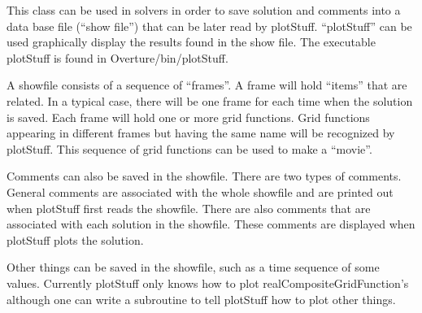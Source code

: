 \documentclass{article}
\begin{document}
This class can be used in solvers in order to save solution and comments
into a data base file (``show file'') that can be later read by plotStuff.
``plotStuff'' can be used graphically display the results found in the
show file. The executable plotStuff is found in Overture/bin/plotStuff.

A showfile consists of a sequence of ``frames''. A frame will hold
``items'' that are related.  In a typical case, there will be one
frame for each time when the solution is saved. Each frame will hold
one or more grid functions. Grid functions appearing in different
frames but having the same name will be recognized by plotStuff. This
sequence of grid functions can be used to make a ``movie''.

Comments can also be saved in the showfile.  There are two types of
comments. General comments are associated with the whole showfile and
are printed out when plotStuff first reads the showfile.  There are
also comments that are associated with each solution in the
showfile. These comments are displayed when plotStuff plots the
solution.

Other things can be saved in the showfile, such as a time sequence
of some values. Currently plotStuff only knows how to plot
realCompositeGridFunction's although one can write a subroutine
to tell plotStuff how to plot other things.


\newcommand{\boxitem}[1]{\begin{picture}(50,25)     %
  \put(-25,5){\framebox(50,20){#1}}
 \end{picture}}
\end{document}
